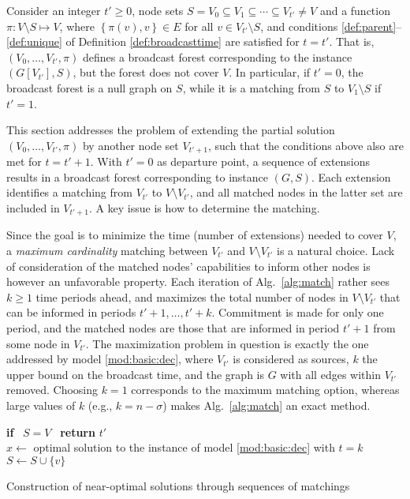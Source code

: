 Consider an integer $t'\geq 0$, node sets $S=V_0\subseteq V_1\subseteq\cdots\subseteq V_{t'}\neq V$ and a function $\pi: V\setminus S\mapsto V$,
where $\left\{\pi(v),v\right\}\in E$ for all $v\in V_{t'}\setminus S$,
and conditions \ref{def:parent}--\ref{def:unique} of Definition \ref{def:broadcasttime} are satisfied for $t=t'$.
That is, $\left(V_0,\ldots,V_{t'},\pi\right)$ defines a broadcast forest corresponding to the instance $\left(G\left[V_{t'}\right],S\right)$,
but the forest does not cover $V$.
In particular, if $t'=0$, the broadcast forest is a null graph on $S$, while it is a matching from $S$ to $V_1\setminus S$ if $t'=1$.

This section addresses the problem of extending the partial solution $\left(V_0,\ldots,V_{t'},\pi\right)$ by another node set $V_{t'+1}$,
such that the conditions above also are met for $t=t'+1$.
With $t'=0$ as departure point, a sequence of extensions results in a broadcast forest corresponding to instance $(G,S)$.
Each extension identifies a matching from $V_{t'}$ to $V\setminus V_{t'}$, and all matched nodes in the latter set are included in $V_{t'+1}$.
A key issue is how to determine the matching.

Since the goal is to minimize the time (number of extensions) needed to cover $V$, a \emph{maximum cardinality} matching between
$V_{t'}$ and $V\setminus V_{t'}$ is a natural choice.
Lack of consideration of the matched nodes' capabilities to inform other nodes is however an unfavorable property.
Each iteration of Alg.\ \ref{alg:match} rather sees $k\geq 1$ time periods ahead, and maximizes the total number of nodes in $V\setminus V_{t'}$
that can be informed in periods $t'+1,\ldots,t'+k$.
Commitment is made for only one period, and the matched nodes are those that are informed in period $t'+1$ from some node in $V_{t'}$.
The maximization problem in question is exactly the one addressed by model \eqref{mod:basic:dec},
where $V_{t'}$ is considered as sources, $k$ the upper bound on the broadcast time, and the graph is $G$ with all edges within $V_{t'}$ removed.
Choosing $k=1$ corresponds to the maximum matching option, whereas large values of $k$ (e.g., $k=n-\sigma$) makes Alg.\ \ref{alg:match} an exact method. 

\begin{algorithm}[]
 {
	\textbf{if} ~$S=V$ ~\textbf{return} $t'$ \\
	$x\leftarrow$ optimal solution to the instance of model \eqref{mod:basic:dec} with $t=k$ \\
	 {
		$S\leftarrow S\cup\{v\}$
	}
}
\caption{Construction of near-optimal solutions through sequences of matchings}
\label{alg:match}
\end{algorithm}

